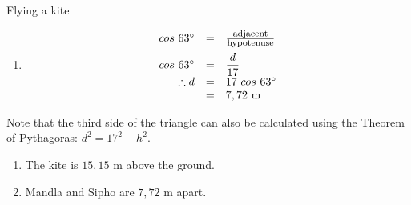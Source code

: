 \begin{wex}{Flying a kite}
{\begin{enumerate}[noitemsep, label=\textbf{\arabic*}. ]
\item
\begin{equation*}
 \begin{array}{ccl}
\hfill cos~63^{\circ} &= & \frac{\mbox{\footnotesize adjacent}}{\mbox{\footnotesize hypotenuse}} \hfill \vspace{5pt}\\
\hfill cos~63^{\circ} &=& \dfrac{d}{17} \hfill \\
\hfill \therefore d &= & 17~cos ~63^{\circ} \hfill \\
\hfill  &=& 7,72~\mbox{m} \hfill \\
\end{array}
\end{equation*}
\end{enumerate}
Note that the third side of the triangle can also be calculated using the Theorem of Pythagoras: $d^{2} = 17^{2} - h^{2}$.

\begin{enumerate}[noitemsep, label=\textbf{\arabic*}. ] 
\item The kite is $15,15$ m above the ground.
\item Mandla and Sipho are $7,72$ m apart.
\end{enumerate}
}
 
\end{wex}

